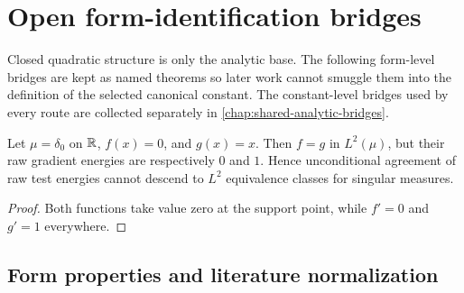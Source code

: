 \chapter{Open form-identification bridges}
\label{chap:open-canonical-bridges}

Closed quadratic structure is only the analytic base.  The following form-level bridges are kept
as named theorems so later work cannot smuggle them into the definition of the selected canonical
constant.  The constant-level bridges used by every route are collected separately in
\cref{chap:shared-analytic-bridges}.

\begin{obstruction}
  \label{obs:dirac-raw-energy}
  \leanok
  Let $\mu=\delta_0$ on $\mathbb{R}$, $f(x)=0$, and $g(x)=x$.  Then $f=g$ in $L^2(\mu)$, but their raw
  gradient energies are respectively $0$ and $1$.  Hence unconditional agreement of raw test
  energies cannot descend to $L^2$ equivalence classes for singular measures.
\end{obstruction}
\begin{proof}
  \leanok
  Both functions take value zero at the support point, while $f'=0$ and $g'=1$ everywhere.
\end{proof}

\section{Form properties and literature normalization}

